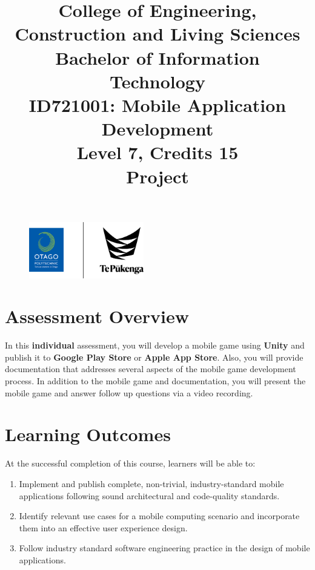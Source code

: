 \documentclass{article}
\author{}
\begin{document}
 

\begin{figure}
	\centering
	\includegraphics[width=50mm]{../img/logo.png}
\end{figure} 

\title{College of Engineering, Construction and Living Sciences\\Bachelor of Information Technology\\ID721001: Mobile Application Development\\Level 7, Credits 15\\\textbf{Project}}
\date{}
\maketitle

\section*{Assessment Overview}
In this \textbf{individual} assessment, you will develop a mobile game using \textbf{Unity} and publish it to \textbf{Google Play Store} or \textbf{Apple App Store}. Also, you will provide documentation that addresses several aspects of the mobile game development process. In addition to the mobile game and documentation, you will present the mobile game and answer follow up questions via a video recording.

\section*{Learning Outcomes}
At the successful completion of this course, learners will be able to:
\begin{enumerate}
	\item Implement and publish complete, non-trivial, industry-standard mobile applications following sound architectural and code-quality standards.
	\item Identify relevant use cases for a mobile computing scenario and incorporate them into an effective user experience design.
	\item Follow industry standard software engineering practice in the design of mobile applications.
\end{enumerate}
\end{document}
